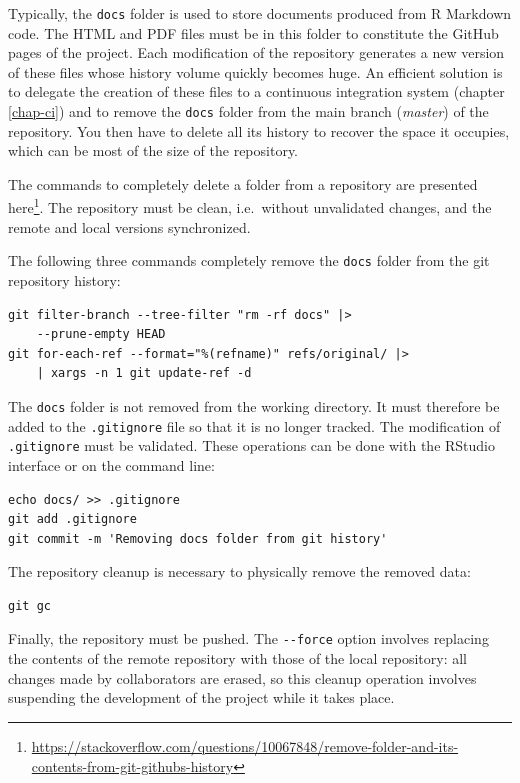 \documentclass[
  12pt,
  american,
  a4paper,
  extrafontsizes,onecolumn,openright
  ]{memoir}
\newlength{\rf}
\begin{document}
Typically, the \texttt{docs} folder is used to store documents produced from R Markdown code.
The HTML and PDF files must be in this folder to constitute the GitHub pages of the project.
Each modification of the repository generates a new version of these files whose history volume quickly becomes huge.
An efficient solution is to delegate the creation of these files to a continuous integration system (chapter \ref{chap-ci}) and to remove the \texttt{docs} folder from the main branch (\emph{master}) of the repository.
You then have to delete all its history to recover the space it occupies, which can be most of the size of the repository.

The commands to completely delete a folder from a repository are presented here\footnote{\url{https://stackoverflow.com/questions/10067848/remove-folder-and-its-contents-from-git-githubs-history}}.
The repository must be clean, i.e.~without unvalidated changes, and the remote and local versions synchronized.

The following three commands completely remove the \texttt{docs} folder from the git repository history:

\begin{verbatim}
git filter-branch --tree-filter "rm -rf docs" |>
    --prune-empty HEAD
git for-each-ref --format="%(refname)" refs/original/ |>
    | xargs -n 1 git update-ref -d
\end{verbatim}

The \texttt{docs} folder is not removed from the working directory.
It must therefore be added to the \texttt{.gitignore} file so that it is no longer tracked.
The modification of \texttt{.gitignore} must be validated.
These operations can be done with the RStudio interface or on the command line:

\begin{verbatim}
echo docs/ >> .gitignore
git add .gitignore
git commit -m 'Removing docs folder from git history'
\end{verbatim}

The repository cleanup is necessary to physically remove the removed data:

\begin{verbatim}
git gc
\end{verbatim}

Finally, the repository must be pushed.
The \texttt{-\/-force} option involves replacing the contents of the remote repository with those of the local repository: all changes made by collaborators are erased, so this cleanup operation involves suspending the development of the project while it takes place.
\end{document}
